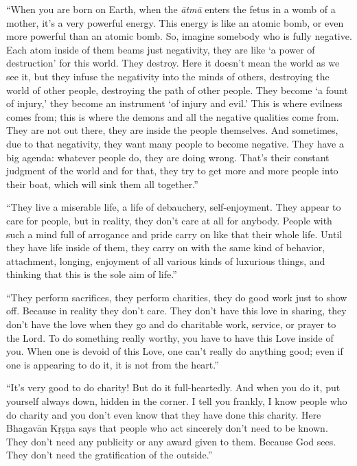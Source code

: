 \documentclass[12pt, twoside, openright]{memoir}
\begin{document}
\enquote{When you are born on Earth, when the \textit{ātmā} enters the fetus in a womb of a mother, it’s a very powerful energy. This energy is like an atomic bomb, or even more powerful than an atomic bomb. So, imagine somebody who is fully negative. Each atom inside of them beams just negativity, they are like \enquote{a power of destruction} for this world. They destroy. Here it doesn’t mean the world as we see it, but they infuse the negativity into the minds of others, destroying the world of other people, destroying the path of other people. They become \enquote{a fount of injury,} they become an instrument \enquote{of injury and evil.} This is where evilness comes from; this is where the demons and all the negative qualities come from. They are not out there, they are inside the people themselves. And sometimes, due to that negativity, they want many people to become negative. They have a big agenda: whatever people do, they are doing wrong. That’s their constant judgment of the world and for that, they try to get more and more people into their boat, which will sink them all together.}

\enquote{They live a miserable life, a life of debauchery, self-enjoyment. They appear to care for people, but in reality, they don’t care at all for anybody. People with such a mind full of arrogance and pride carry on like that their whole life. Until they have life inside of them, they carry on with the same kind of behavior, attachment, longing, enjoyment of all various kinds of luxurious things, and thinking that this is the sole aim of life.}

\enquote{They perform sacrifices, they perform charities, they do good work just to show off. Because in reality they don’t care. They don’t have this love in sharing, they don’t have the love when they go and do charitable work, service, or prayer to the Lord. To do something really worthy, you have to have this Love inside of you. When one is devoid of this Love, one can’t really do anything good; even if one is appearing to do it, it is not from the heart.}

\enquote{It’s very good to do charity! But do it full-heartedly. And when you do it, put yourself always down, hidden in the corner. I tell you frankly, I know people who do charity and you don’t even know that they have done this charity. Here Bhagavān Kṛṣṇa says that people who act sincerely don’t need to be known. They don’t need any publicity or any award given to them. Because God sees. They don’t need the gratification of the outside.}
\end{document}

